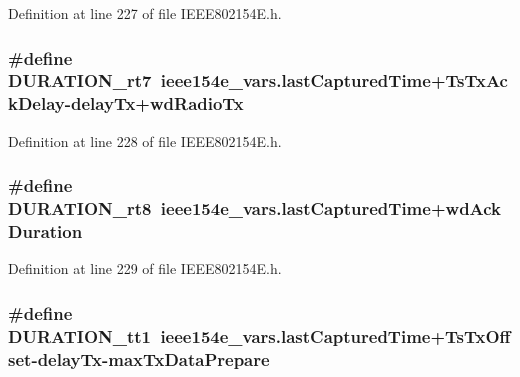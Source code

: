Definition at line 227 of file I\+E\+E\+E802154\+E.\+h.

\subsubsection[{\texorpdfstring{D\+U\+R\+A\+T\+I\+O\+N\+\_\+rt7}{DURATION_rt7}}]{\setlength{\rightskip}{0pt plus 5cm}\#define D\+U\+R\+A\+T\+I\+O\+N\+\_\+rt7~ieee154e\+\_\+vars.\+last\+Captured\+Time+{\bf Ts\+Tx\+Ack\+Delay}-\/{\bf delay\+Tx}+{\bf wd\+Radio\+Tx}}\hypertarget{group___i_e_e_e802154_e_gafd59b8c389fce37f8fabc8da6e05b96b}{}\label{group___i_e_e_e802154_e_gafd59b8c389fce37f8fabc8da6e05b96b}


Definition at line 228 of file I\+E\+E\+E802154\+E.\+h.

\subsubsection[{\texorpdfstring{D\+U\+R\+A\+T\+I\+O\+N\+\_\+rt8}{DURATION_rt8}}]{\setlength{\rightskip}{0pt plus 5cm}\#define D\+U\+R\+A\+T\+I\+O\+N\+\_\+rt8~ieee154e\+\_\+vars.\+last\+Captured\+Time+{\bf wd\+Ack\+Duration}}\hypertarget{group___i_e_e_e802154_e_ga364757b1318ad578c3643eb588188e2b}{}\label{group___i_e_e_e802154_e_ga364757b1318ad578c3643eb588188e2b}


Definition at line 229 of file I\+E\+E\+E802154\+E.\+h.

\subsubsection[{\texorpdfstring{D\+U\+R\+A\+T\+I\+O\+N\+\_\+tt1}{DURATION_tt1}}]{\setlength{\rightskip}{0pt plus 5cm}\#define D\+U\+R\+A\+T\+I\+O\+N\+\_\+tt1~ieee154e\+\_\+vars.\+last\+Captured\+Time+{\bf Ts\+Tx\+Offset}-\/{\bf delay\+Tx}-\/{\bf max\+Tx\+Data\+Prepare}}\hypertarget{group___i_e_e_e802154_e_ga8be6ae45ada97b97aa4ce688365b5085}{}\label{group___i_e_e_e802154_e_ga8be6ae45ada97b97aa4ce688365b5085}


